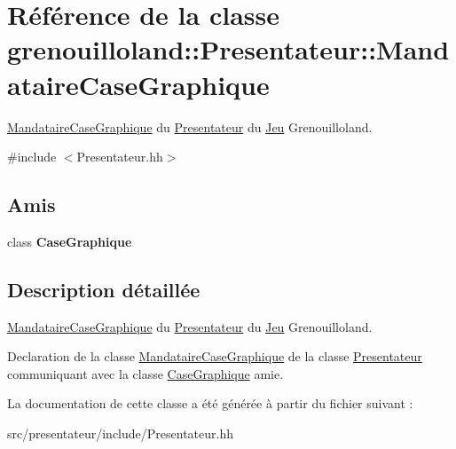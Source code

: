 \hypertarget{classgrenouilloland_1_1Presentateur_1_1MandataireCaseGraphique}{\section{Référence de la classe grenouilloland\-:\-:Presentateur\-:\-:Mandataire\-Case\-Graphique}
\label{classgrenouilloland_1_1Presentateur_1_1MandataireCaseGraphique}
}


\hyperlink{classgrenouilloland_1_1Presentateur_1_1MandataireCaseGraphique}{Mandataire\-Case\-Graphique} du \hyperlink{classgrenouilloland_1_1Presentateur}{Presentateur} du \hyperlink{classgrenouilloland_1_1Jeu}{Jeu} Grenouilloland.  




{\ttfamily \#include $<$Presentateur.\-hh$>$}

\subsection*{Amis}
\begin{DoxyCompactItemize}
\item 
\hypertarget{classgrenouilloland_1_1Presentateur_1_1MandataireCaseGraphique_ac12b0ba9ebe667c8408ac35bf21598e8}{class {\bfseries Case\-Graphique}}\label{classgrenouilloland_1_1Presentateur_1_1MandataireCaseGraphique_ac12b0ba9ebe667c8408ac35bf21598e8}

\end{DoxyCompactItemize}


\subsection{Description détaillée}
\hyperlink{classgrenouilloland_1_1Presentateur_1_1MandataireCaseGraphique}{Mandataire\-Case\-Graphique} du \hyperlink{classgrenouilloland_1_1Presentateur}{Presentateur} du \hyperlink{classgrenouilloland_1_1Jeu}{Jeu} Grenouilloland. 

Declaration de la classe \hyperlink{classgrenouilloland_1_1Presentateur_1_1MandataireCaseGraphique}{Mandataire\-Case\-Graphique} de la classe \hyperlink{classgrenouilloland_1_1Presentateur}{Presentateur} communiquant avec la classe \hyperlink{classgrenouilloland_1_1CaseGraphique}{Case\-Graphique} amie. 

La documentation de cette classe a été générée à partir du fichier suivant \-:\begin{DoxyCompactItemize}
\item 
src/presentateur/include/Presentateur.\-hh\end{DoxyCompactItemize}

